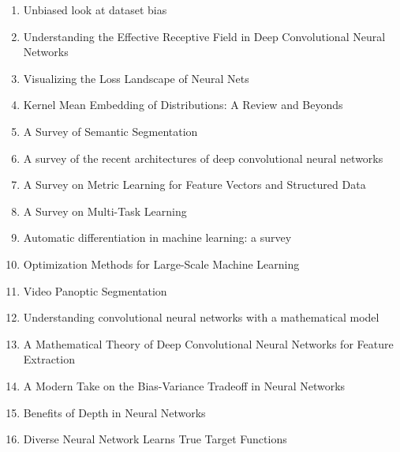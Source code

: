 \documentclass[acmlarge]{acmart}
\begin{document}
\begin{enumerate}
	\item Unbiased look at dataset bias \cite{Torralba2011UnbiasedLA} 

	\item Understanding the Effective Receptive Field in Deep Convolutional Neural Networks \cite{Luo2016UnderstandingTE} 

	\item Visualizing the Loss Landscape of Neural Nets \cite{Li2018VisualizingTL} 

	\item Kernel Mean Embedding of Distributions: A Review and Beyonds \cite{Muandet2017KernelME} 

	\item A Survey of Semantic Segmentation \cite{Thoma2016ASO} 

	\item A survey of the recent architectures of deep convolutional neural networks \cite{Khan2020ASO} 

	\item A Survey on Metric Learning for Feature Vectors and Structured Data \cite{Bellet2013ASO} 

	\item A Survey on Multi-Task Learning \cite{Zhang2017ASO} 

	\item Automatic differentiation in machine learning: a survey \cite{Baydin2017AutomaticDI} 

	\item Optimization Methods for Large-Scale Machine Learning \cite{Bottou2018OptimizationMF} 

	\item Video Panoptic Segmentation \cite{Kim2020VideoPS} 

	\item Understanding convolutional neural networks with a mathematical model \cite{Kuo2016UnderstandingCN} 

	\item A Mathematical Theory of Deep Convolutional Neural Networks for Feature Extraction \cite{Wiatowski2018AMT} 

	\item A Modern Take on the Bias-Variance Tradeoff in Neural Networks \cite{Neal2018AMT} 

	\item Benefits of Depth in Neural Networks \cite{Telgarsky2016BenefitsOD} 

	\item Diverse Neural Network Learns True Target Functions \cite{Xie2017DiverseNN} 


\end{enumerate}
\end{document}
